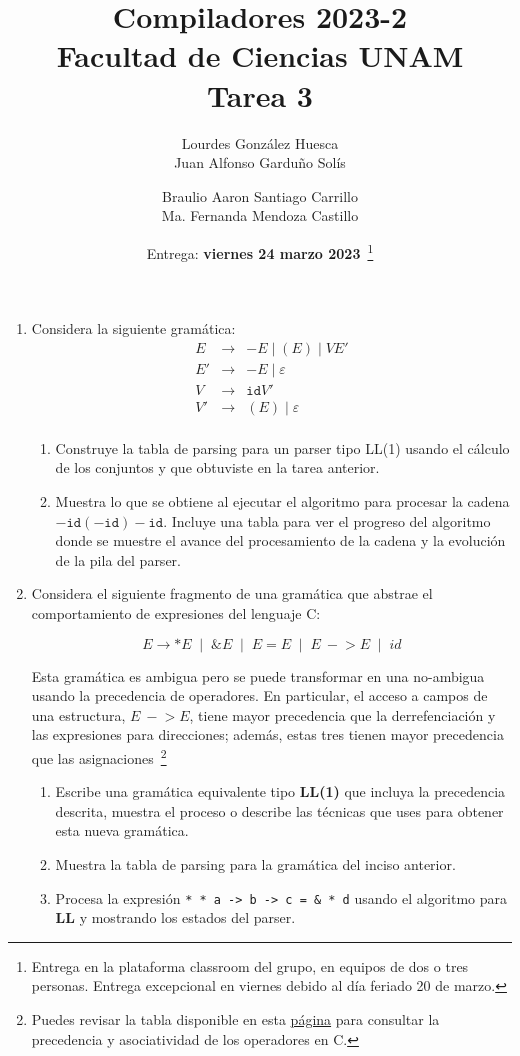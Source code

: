 \documentclass[11pt,letterpaper]{article}
\title{Compiladores 2023-2\\ Facultad de Ciencias UNAM \\ Tarea 3}
\author{Lourdes Gonz\'alez Huesca\\ Juan Alfonso Gardu\~no Sol\'is \and  
Braulio Aaron Santiago Carrillo  \\Ma. Fernanda Mendoza Castillo}
\date{Entrega: \textbf{viernes 24 marzo 2023}~\footnote{Entrega en la 
plataforma classroom del grupo, en equipos de dos o tres personas.\newline
Entrega excepcional en viernes debido al d\'ia feriado 20 de marzo.}}
\begin{document}
\maketitle


\begin{enumerate}
\item Considera la siguiente gram\'atica:
\[
\begin{array}{rcl}
E & \to & -E \mid (E) \mid VE'\\
E' & \to & -E \mid \varepsilon\\
V & \to & \mathtt{id}V'\\
V' & \to & (E) \mid \varepsilon\\
\end{array}
\]
\begin{enumerate}
\item Construye la tabla de parsing para un parser tipo 
LL(1) usando el c\'alculo de los conjuntos {\ffst} y {\ffollow} que obtuviste 
en la tarea anterior. 
\item Muestra 
lo que se obtiene al ejecutar el algoritmo para procesar la cadena 
$-\mathtt{id}(-\mathtt{id})-\mathtt{id}$.
Incluye una tabla para ver el progreso del algoritmo donde se muestre el avance 
del procesamiento de la cadena y la evoluci\'on de la pila del parser. 
\end{enumerate}



\item Considera el siguiente fragmento de una gram\'atica que abstrae el 
comportamiento de expresiones del lenguaje \textsf{C}:

\[
E \to *E \;\mid\; \&E \;\mid\; E = E \;\mid\; E\ -\!> E \;\mid\; id
\]

Esta gram\'atica es ambigua pero se puede transformar en una no-ambigua usando
la precedencia de operadores.
En particular, el acceso a campos de una estructura, $E\ -\!> E$, tiene mayor 
precedencia que la derrefenciaci\'on y las expresiones para direcciones; 
adem\'as, estas tres tienen mayor precedencia que las 
asignaciones~\footnote{Puedes revisar la tabla disponible en esta 
\href{https://justdocodings.blogspot.com/2018/06/operator-precedence-and-associativity.html}{p\'agina} 
para consultar la precedencia y asociatividad de los operadores en \textsc{C}.}
\begin{enumerate}
\item Escribe una gram\'atica equivalente tipo \textbf{LL(1)} que incluya la
precedencia descrita, muestra el proceso o describe las técnicas que uses para 
obtener esta nueva gramática.
\item Muestra la tabla de parsing para la gram\'atica del inciso anterior.
\item Procesa la expresi\'on
\verb!* * a -> b -> c = & * d!  usando el algoritmo para \textbf{LL} y 
mostrando los estados del parser. 
\end{enumerate}


\end{enumerate}
\end{document}
